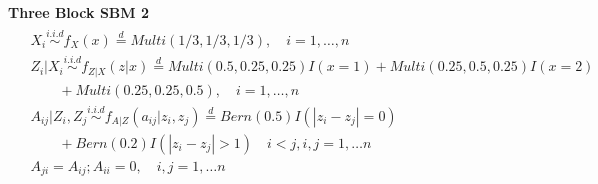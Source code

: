 \documentclass[12pt]{article}
\theoremstyle{definition}
\begin{document}
\textbf{Three Block SBM 2}
\begin{equation}
\begin{gathered}
\begin{aligned}
& X_{i} \overset{i.i.d}{\sim} f_{X}(x)   \stackrel{d}{=}  Multi(1/3, 1/3, 1/3), \quad i = 1, \ldots , n \\ & Z_{i} | X_{i}  \overset{i.i.d}{\sim}    f_{Z|X}(z|x)  \stackrel{d}{=}   Multi(0.5, 0.25, 0.25) I( x = 1 ) +   Multi(0.25, 0.5, 0.25) I (x = 2)   \\ &  \quad \quad + Multi(0.25, 0.25, 0.5), \quad  i = 1,\ldots,n  \\
& A_{ij} | Z_{i}, Z_{j}   \overset{i.i.d}{\sim}   f_{A|Z}(a_{ij} | z_{i}, z_{j})  \stackrel{d}{=} Bern(0.5) I ( |z_{i} - z_{j}| = 0 ) \\  &  \quad \quad + Bern(0.2) I(|z_{i} - z_{j}| > 1) \quad i < j, i,j=1, \ldots n \\ & A_{ji} = A_{ij} ;   A_{ii} = 0,   \quad  i,j=1, \ldots n
\end{aligned}
\end{gathered}
\end{equation}
\end{document}
